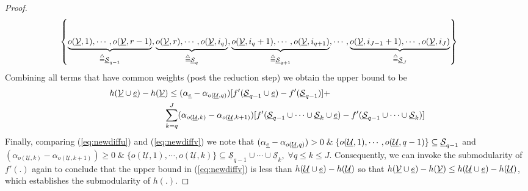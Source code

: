 \documentclass[11pt] {article}
\newcommand{\Uulc} {{\underline{\mathcal U}}}
\newcommand{\Vulc} {{\underline{\mathcal V}}}
\newcommand{\Sulc} {{\underline{\mathcal S}}}
\begin{document}
\begin{proof}
 \begin{eqnarray*}\left\{\underbrace{o(\Vulc,1),\cdots,o(\Vulc,r-1)}_{\define \Sulc_{q-1}},\underbrace{o(\Vulc,r),\cdots,o(\Vulc,i_q)}_{\define \Sulc_{q}}, \underbrace{o(\Vulc,i_q+1),\cdots,o(\Vulc,i_{q+1})}_{\define \Sulc_{q+1}},\cdots,\underbrace{o(\Vulc,i_{J-1}+1),\cdots,o(\Vulc,i_J)}_{\define \Sulc_{J}}\right\}\;\;\;\;\;\;\;
 \end{eqnarray*}
Combining all terms that have common weights (post the reduction step) we obtain the upper bound to be
\begin{eqnarray}\label{eq:newdiffv}
  \nonumber  h(\Vulc\cup\eul)- h(\Vulc)\leq (\alpha_{\eul}-\alpha_{o(\Uulc,q)})[f'(\Sulc_{q-1}\cup\eul)-f'(\Sulc_{q-1})] +\;\;\;\;\;\;\;\;\;\;\;\;\;\;\;\;\;\;\;\;\;\;\;\;\;\;\;\;\;\;\;\;\;\;\;\;\;\;\;\;
   \\    \sum_{k=q}^{J} (\alpha_{o(\Uulc,k)}-\alpha_{o(\Uulc,k+1)})[f'(\Sulc_{q-1}\cup\cdots\cup\Sulc_k\cup\eul)-f'(\Sulc_{q-1}\cup\cdots\cup\Sulc_k)]
 \end{eqnarray}
Finally, comparing (\ref{eq:newdiffu}) and (\ref{eq:newdiffv}) we note that $(\alpha_{\eul}-\alpha_{o(\Uulc,q)})> 0\;\&\;\{o(\Uulc,1),\cdots,o(\Uulc,q-1)\}\subseteq\Sulc_{q-1}$ and $(\alpha_{o(\Uulc,k)}-\alpha_{o(\Uulc,k+1)})\geq 0\;\&\;\{o(\Uulc,1),\cdots,o(\Uulc,k)\}\subseteq\Sulc_{q-1}\cup\cdots\cup\Sulc_k,\;\forall q\leq k\leq J$. Consequently,
we can invoke the submodularity of $f'(.)$ again to conclude that the upper bound in (\ref{eq:newdiffv}) is less than $h(\Uulc\cup\eul)- h(\Uulc)$ so that $h(\Vulc\cup\eul)- h(\Vulc)\leq h(\Uulc\cup\eul)- h(\Uulc)$, which establishes the submodularity of $h(.)$.





\end{proof}
\end{document}

